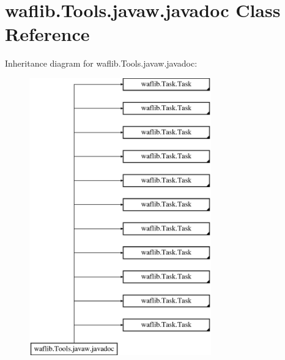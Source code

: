 \hypertarget{classwaflib_1_1_tools_1_1javaw_1_1javadoc}{}\section{waflib.\+Tools.\+javaw.\+javadoc Class Reference}
\label{classwaflib_1_1_tools_1_1javaw_1_1javadoc}
Inheritance diagram for waflib.\+Tools.\+javaw.\+javadoc\+:\begin{figure}[H]
\begin{center}
\leavevmode
\includegraphics[height=12.000000cm]{classwaflib_1_1_tools_1_1javaw_1_1javadoc}
\end{center}
\end{figure}
